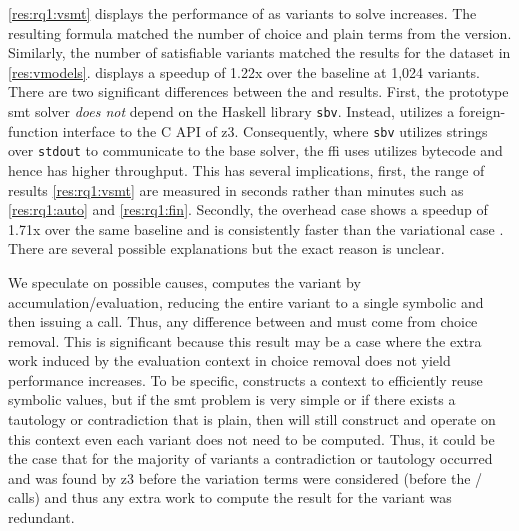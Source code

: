 \autoref{res:rq1:vsmt} displays the performance of \vsmt{} as variants to solve
increases. The resulting \evpl{} formula matched the number of choice and plain
terms from the \vsat{} version. Similarly, the number of satisfiable variants
matched the results for the \fin{} dataset in \autoref{res:vmodels}. \vsmt{}
displays a speedup of 1.22x over the baseline \vTop{} at 1,024 variants. There
are two significant differences between the \vsmt{} and \vsat{} results. First,
the prototype \ac{smt} solver \emph{does not} depend on the Haskell library
\texttt{sbv}. Instead, \vsmt{} utilizes a foreign-function interface to the C
API of z3. Consequently, where \texttt{sbv} utilizes strings over
\texttt{stdout} to communicate to the base solver, the ffi \vsmt{} uses utilizes
bytecode and hence has higher throughput. This has several implications, first,
the range of results \autoref{res:rq1:vsmt} are measured in seconds rather than
minutes such as \autoref{res:rq1:auto} and \autoref{res:rq1:fin}. Secondly, the
overhead case \pTov{} shows a speedup of 1.71x over the same baseline and is
consistently faster than the variational case \vTov{}. There are several
possible explanations but the exact reason is unclear.

We speculate on possible causes, \pTov{} computes the variant by
accumulation/evaluation, reducing the entire variant to a single symbolic and
then issuing a  call. Thus, any difference between \vTov{} and
\pTov{} must come from choice removal.
%
This is significant because this result may be a case where the extra work
induced by the evaluation context in choice removal does not yield performance
increases. To be specific, \vTov{} constructs a context to efficiently reuse
symbolic values, but if the \ac{smt} problem is very simple or if there exists a
tautology or contradiction that is plain, then \vTov{} will still construct and
operate on this context even each variant does not need to be computed. Thus, it
could be the case that for the majority of variants a contradiction or tautology
occurred and was found by z3 before the variation terms were considered (before
the / calls) and thus any extra work to compute the result for
the variant was redundant.

